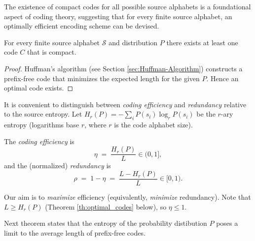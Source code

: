 The existence of compact codes for all possible source alphabets is a foundational aspect of coding theory, suggesting that for every finite source alphabet, an optimally efficient encoding scheme can be devised.

\begin{proposition}
For every finite source alphabet $\mathcal{S}$ and distribution $P$ there exists at least one code $C$ that is compact.
\end{proposition}
\begin{proof}
Huffman's algorithm (see Section \ref{sec:Huffman-Algorithm}) constructs a prefix-free code that minimizes the expected length for the given $P$. Hence an optimal code exists.
\end{proof}

It is convenient to distinguish between \emph{coding efficiency} and \emph{redundancy} relative to the source entropy. Let $H_r(P)=-\sum_i P(s_i)\log_r P(s_i)$ be the $r$-ary entropy (logarithms base $r$, where $r$ is the code alphabet size).

\begin{definition}
The \emph{coding efficiency} is
\[
\eta \;=\; \frac{H_r(P)}{L}\in(0,1],
\]
and the (normalized) \emph{redundancy} is
\[
\rho \;=\; 1-\eta \;=\; \frac{L-H_r(P)}{L}\in[0,1).
\]
\end{definition}

Our aim is to \emph{maximize} efficiency (equivalently, \emph{minimize} redundancy). Note that $L\ge H_r(P)$ (Theorem \ref{th:optimal_codes} below), so $\eta\le 1$.

Next theorem states that the entropy of the probability distibution $P$ poses a limit to the average length of prefix-free codes.

